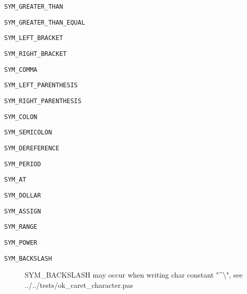 \documentclass{report}
\begin{document}
\begin{list}{}
\begin{description}
\item[\texttt{SYM{\_}GREATER{\_}THAN}] \label{PasDoc_Tokenizer-SYM_GREATER_THAN}
\index{}
 
\item[\texttt{SYM{\_}GREATER{\_}THAN{\_}EQUAL}] \label{PasDoc_Tokenizer-SYM_GREATER_THAN_EQUAL}
\index{}
 
\item[\texttt{SYM{\_}LEFT{\_}BRACKET}] \label{PasDoc_Tokenizer-SYM_LEFT_BRACKET}
\index{}
 
\item[\texttt{SYM{\_}RIGHT{\_}BRACKET}] \label{PasDoc_Tokenizer-SYM_RIGHT_BRACKET}
\index{}
 
\item[\texttt{SYM{\_}COMMA}] \label{PasDoc_Tokenizer-SYM_COMMA}
\index{}
 
\item[\texttt{SYM{\_}LEFT{\_}PARENTHESIS}] \label{PasDoc_Tokenizer-SYM_LEFT_PARENTHESIS}
\index{}
 
\item[\texttt{SYM{\_}RIGHT{\_}PARENTHESIS}] \label{PasDoc_Tokenizer-SYM_RIGHT_PARENTHESIS}
\index{}
 
\item[\texttt{SYM{\_}COLON}] \label{PasDoc_Tokenizer-SYM_COLON}
\index{}
 
\item[\texttt{SYM{\_}SEMICOLON}] \label{PasDoc_Tokenizer-SYM_SEMICOLON}
\index{}
 
\item[\texttt{SYM{\_}DEREFERENCE}] \label{PasDoc_Tokenizer-SYM_DEREFERENCE}
\index{}
 
\item[\texttt{SYM{\_}PERIOD}] \label{PasDoc_Tokenizer-SYM_PERIOD}
\index{}
 
\item[\texttt{SYM{\_}AT}] \label{PasDoc_Tokenizer-SYM_AT}
\index{}
 
\item[\texttt{SYM{\_}DOLLAR}] \label{PasDoc_Tokenizer-SYM_DOLLAR}
\index{}
 
\item[\texttt{SYM{\_}ASSIGN}] \label{PasDoc_Tokenizer-SYM_ASSIGN}
\index{}
 
\item[\texttt{SYM{\_}RANGE}] \label{PasDoc_Tokenizer-SYM_RANGE}
\index{}
 
\item[\texttt{SYM{\_}POWER}] \label{PasDoc_Tokenizer-SYM_POWER}
\index{}
 
\item[\texttt{SYM{\_}BACKSLASH}] \label{PasDoc_Tokenizer-SYM_BACKSLASH}
\index{}
SYM{\_}BACKSLASH may occur when writing char constant "{\^{}}{\textbackslash}", see ../../tests/ok{\_}caret{\_}character.pas
\end{description}


\end{list}
\end{document}
